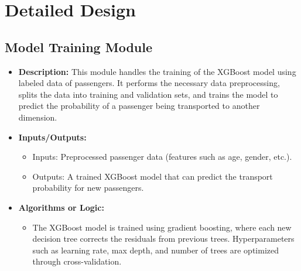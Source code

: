 \documentclass[15pt]{article}
\begin{document}
\section{Detailed Design}

\subsection{Model Training Module}
\begin{itemize}
    \item \textbf{Description:} This module handles the training of the XGBoost model using labeled data of passengers. It performs the necessary data preprocessing, splits the data into training and validation sets, and trains the model to predict the probability of a passenger being transported to another dimension.
    \item \textbf{Inputs/Outputs:} 
    \begin{itemize}
        \item Inputs: Preprocessed passenger data (features such as age, gender, etc.).
        \item Outputs: A trained XGBoost model that can predict the transport probability for new passengers.
    \end{itemize}
    \item \textbf{Algorithms or Logic:} 
    \begin{itemize}
        \item The XGBoost model is trained using gradient boosting, where each new decision tree corrects the residuals from previous trees. Hyperparameters such as learning rate, max depth, and number of trees are optimized through cross-validation.
    \end{itemize}
\end{itemize}
\end{document}
